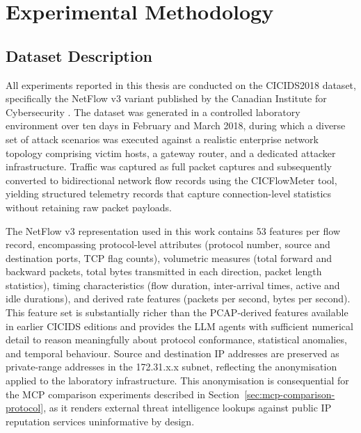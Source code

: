 \chapter{Experimental Methodology}
\label{ch:methodology}

\section{Dataset Description}
\label{sec:dataset-description}

All experiments reported in this thesis are conducted on the CICIDS2018 dataset, specifically the NetFlow v3 variant published by the Canadian Institute for Cybersecurity \autocite{Sharafaldin2018}. The dataset was generated in a controlled laboratory environment over ten days in February and March 2018, during which a diverse set of attack scenarios was executed against a realistic enterprise network topology comprising victim hosts, a gateway router, and a dedicated attacker infrastructure. Traffic was captured as full packet captures and subsequently converted to bidirectional network flow records using the CICFlowMeter tool, yielding structured telemetry records that capture connection-level statistics without retaining raw packet payloads.

The NetFlow v3 representation used in this work contains 53 features per flow record, encompassing protocol-level attributes (protocol number, source and destination ports, TCP flag counts), volumetric measures (total forward and backward packets, total bytes transmitted in each direction, packet length statistics), timing characteristics (flow duration, inter-arrival times, active and idle durations), and derived rate features (packets per second, bytes per second). This feature set is substantially richer than the PCAP-derived features available in earlier CICIDS editions and provides the LLM agents with sufficient numerical detail to reason meaningfully about protocol conformance, statistical anomalies, and temporal behaviour. Source and destination IP addresses are preserved as private-range addresses in the 172.31.x.x subnet, reflecting the anonymisation applied to the laboratory infrastructure. This anonymisation is consequential for the MCP comparison experiments described in Section~\ref{sec:mcp-comparison-protocol}, as it renders external threat intelligence lookups against public IP reputation services uninformative by design.

